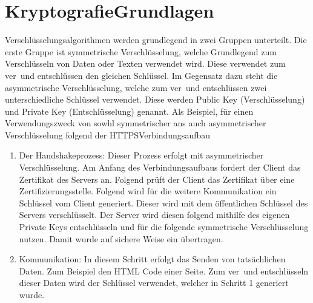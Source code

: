


\section{Kryptografie\textendash Grundlagen}
Verschlüsselungsalgorithmen werden grundlegend in zwei Gruppen unterteilt.
Die erste Gruppe ist symmetrische Verschlüsselung, welche Grundlegend zum Verschlüsseln von Daten
oder Texten verwendet wird. Diese verwendet zum ver\textendash\ und entschlüssen den gleichen Schlüssel.
Im Gegensatz dazu steht die asymmetrische Verschlüsselung, welche zum ver\textendash\ und entschlüssen
zwei unterschiedliche Schlüssel verwendet. Diese werden Public Key (Verschlüsselung) und 
Private Key (Entschlüsselung) genannt. Als Beispiel, für einen Verwendungszweck von sowhl symmetrischer ans auch 
asymmetrischer Verschlüsselung folgend der HTTPS\textendash Verbindungsaufbau
\begin{enumerate}
    \item Der Handshakeprozess: Dieser Prozess erfolgt mit asymmetrischer Verschlüsselung. 
    Am Anfang des Verbindungsaufbaus fordert der Client
    das Zertifikat des Servers an. Folgend prüft der Client das Zertifikat über eine Zertifizierungsstelle.
    Folgend wird für die weitere Kommunikation ein Schlüssel vom Client generiert. Dieser wird
    mit dem öffentlichen Schlüssel des Servers verschlüsselt. Der Server wird diesen folgend mithilfe des 
    eigenen Private Keys entschlüsseln und für die folgende symmetrische Verschlüsselung nutzen. Damit
    wurde auf sichere Weise ein  übertragen.
    \item Kommunikation: In diesem Schritt erfolgt das Senden von tatsächlichen Daten. Zum Beispiel den
    HTML Code einer Seite. Zum ver\textendash\ und entschlüsseln dieser Daten wird der Schlüssel verwendet,
    welcher in Schritt 1 generiert wurde.
\end{enumerate}
